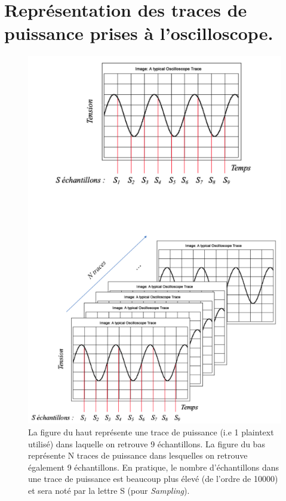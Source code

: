 \documentclass[oneside]{book}
\begin{document}
\section{Représentation des traces de puissance prises à l'oscilloscope.}
\label{ann:traceExplain}
\begin{figure}[htbp]
    \centering
    \includegraphics[scale=0.65]{image/Sampling}
    \caption{La figure du haut représente une trace de puissance (i.e 1 plaintext utilisé) dans laquelle on retrouve 9 échantillons. La figure du bas représente N traces de puissance dans lesquelles on retrouve également 9 échantillons. En pratique, le nombre d'échantillons dans une trace de puissance est beaucoup plus élevé (de l'ordre de 10000) et sera noté par la lettre S (pour \textit{Sampling}).}
    \label{fig:traceExplain}
\end{figure}
\end{document}

